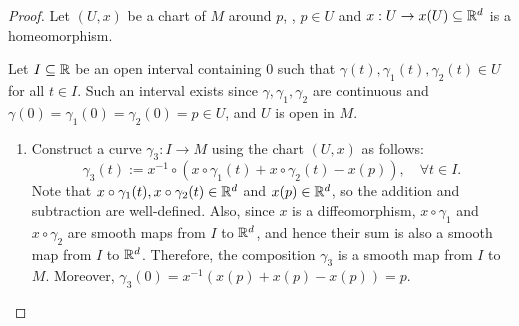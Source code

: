 \begin{proof}
    Let \((U, x)\) be a chart of \(M\) around \(p\), \ie, \(p \in U\) and \(x: U \to x(U) \subseteq \mathbb R^d\) is a homeomorphism.

    Let \(I \subseteq \mathbb R\) be an open interval containing \(0\) such that \(\gamma(t), \gamma_1(t), \gamma_2(t) \in U\) for all \(t \in I\). Such an interval exists since \(\gamma, \gamma_1, \gamma_2\) are continuous and \(\gamma(0) = \gamma_1(0) = \gamma_2(0) = p \in U\), and \(U\) is open in \(M\).
    \begin{enumerate}
        \item Construct a curve \(\gamma_3: I \to M\) using the chart \((U, x)\) as follows:
              \begin{equation}
                  \gamma_3(t) := x^{-1} \circ (x \circ \gamma_1(t) + x \circ \gamma_2(t) - x(p)), \quad \forall t \in I.
              \end{equation}
              Note that \(x \circ \gamma_1(t), x \circ \gamma_2(t) \in \mathbb R^d\) and \(x(p) \in \mathbb R^d\), so the addition and subtraction are well-defined. Also, since \(x\) is a diffeomorphism, \(x \circ \gamma_1\) and \(x \circ \gamma_2\) are smooth maps from \(I\) to \(\mathbb R^d\), and hence their sum is also a smooth map from \(I\) to \(\mathbb R^d\). Therefore, the composition \(\gamma_3\) is a smooth map from \(I\) to \(M\). Moreover, \(\gamma_3(0) = x^{-1}(x(p) + x(p) - x(p)) = p\).


\end{enumerate}
\end{proof}
